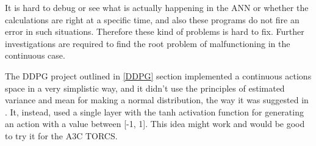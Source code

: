 It is hard to debug or see what is actually happening in the ANN or whether the calculations are right at a specific time, and also these programs do not fire an error in such situations. Therefore these kind of problems is hard to fix. Further investigations are required to find the root problem of malfunctioning in the continuous case.

The DDPG project outlined in \ref{DDPG} section implemented a continuous actions space in a very simplistic way, and it didn't use the principles of estimated variance and mean for making a normal distribution, the way it was suggested in \cite{Sutton}. It, instead, used a single layer with the tanh activation function for generating an action with a value between [-1, 1]. This idea might work and would be good to try it for the A3C TORCS.